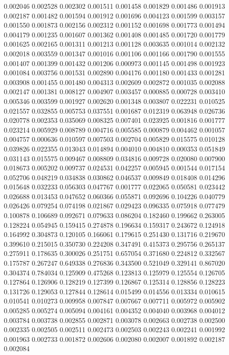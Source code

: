0.002046
0.002528
0.002302
0.001511
0.001458
0.001829
0.001486
0.001913
0.002187
0.001482
0.001594
0.001912
0.001696
0.004123
0.001599
0.003157
0.001550
0.001873
0.002156
0.002312
0.001152
0.001698
0.001773
0.001494
0.004179
0.001235
0.001607
0.001362
0.001408
0.001485
0.001720
0.001779
0.001625
0.002165
0.001311
0.001213
0.001128
0.003635
0.001014
0.002132
0.002018
0.003559
0.001347
0.001016
0.001106
0.001166
0.001790
0.001555
0.001407
0.001399
0.001432
0.001206
0.000973
0.001145
0.001498
0.001923
0.001084
0.003756
0.001531
0.002890
0.004176
0.001180
0.001433
0.001281
0.003908
0.001455
0.001480
0.004313
0.002609
0.002872
0.001035
0.002088
0.002147
0.001381
0.008127
0.004907
0.003457
0.000885
0.000728
0.003410
0.005346
0.003599
0.001927
0.002620
0.001348
0.003807
0.022231
0.010525
0.021557
0.032855
0.005753
0.037551
0.001687
0.012319
0.063948
0.026736
0.020778
0.002353
0.035069
0.008325
0.007401
0.023925
0.001816
0.001777
0.023214
0.005929
0.008789
0.004716
0.005585
0.000879
0.004462
0.001057
0.004757
0.000636
0.010597
0.007503
0.002704
0.005829
0.015575
0.010128
0.039826
0.022355
0.013043
0.014894
0.004010
0.004810
0.000353
0.051849
0.031143
0.015575
0.009467
0.008809
0.034816
0.009728
0.020080
0.007900
0.018673
0.005202
0.009737
0.024531
0.042257
0.005945
0.001544
0.017154
0.052706
0.048219
0.034838
0.030862
0.046537
0.009849
0.018408
0.014296
0.015648
0.032233
0.056303
0.047767
0.001777
0.022065
0.050581
0.023442
0.026688
0.013453
0.047652
0.060366
0.055871
0.092696
0.104226
0.040779
0.026426
0.079254
0.074198
0.021867
0.029423
0.096335
0.075918
0.077479
0.100878
0.106689
0.092671
0.079633
0.086204
0.182460
0.199662
0.263005
0.128224
0.054945
0.159415
0.274878
0.196634
0.159317
0.243672
0.124918
0.164992
0.304873
0.120105
0.166061
0.179615
0.251430
0.131716
0.219670
0.399610
0.215015
0.350730
0.224208
0.347491
0.415373
0.295756
0.265137
0.275911
0.178635
0.300026
0.251751
0.657054
0.371680
0.224812
0.332567
0.175787
0.267247
0.649338
0.276836
0.343500
0.521049
0.329141
0.867020
0.304374
0.784034
0.125909
0.475268
0.123813
0.125979
0.125554
0.126705
0.127864
0.126906
0.128219
0.127399
0.126867
0.125314
0.128856
0.128223
0.131726
0.129053
0.127844
0.128614
0.015499
0.014556
0.013334
0.010615
0.010541
0.010273
0.009958
0.007847
0.007667
0.007711
0.005972
0.005902
0.005285
0.005274
0.005094
0.004161
0.004352
0.004040
0.003968
0.004012
0.003784
0.003738
0.002855
0.002871
0.003078
0.002663
0.002738
0.002500
0.002335
0.002505
0.002511
0.002473
0.002503
0.002243
0.002241
0.001992
0.001963
0.002733
0.001872
0.002606
0.002080
0.002007
0.001892
0.002187
0.002084
